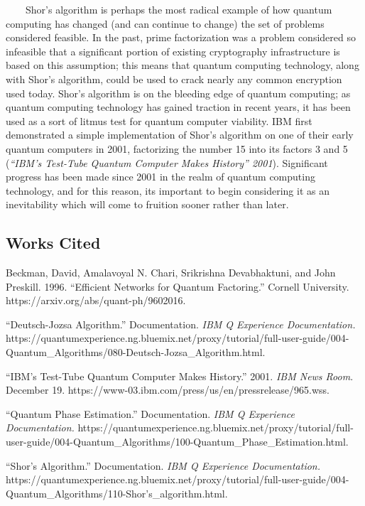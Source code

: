 \documentclass[11pt]{article}
\begin{document}
~~~~Shor's algorithm is perhaps the most radical example of how quantum
computing has changed (and can continue to change) the set of problems
considered feasible. In the past, prime factorization was a problem
considered so infeasible that a significant portion of existing
cryptography infrastructure is based on this assumption; this means that
quantum computing technology, along with Shor's algorithm, could be used
to crack nearly any common encryption used today. Shor's algorithm is on
the bleeding edge of quantum computing; as quantum computing technology
has gained traction in recent years, it has been used as a sort of
litmus test for quantum computer viability. IBM first demonstrated a
simple implementation of Shor's algorithm on one of their early quantum
computers in 2001, factorizing the number 15 into its factors 3 and 5
(\emph{``IBM's Test-Tube Quantum Computer Makes History'' 2001}).
Significant progress has been made since 2001 in the realm of quantum
computing technology, and for this reason, its important to begin
considering it as an inevitability which will come to fruition sooner
rather than later.

    \hypertarget{works-cited}{%
\subsection{Works Cited}\label{works-cited}}

Beckman, David, Amalavoyal N. Chari, Srikrishna Devabhaktuni, and John
Preskill. 1996. ``Efficient Networks for Quantum Factoring.'' Cornell
University. https://{}arxiv.org/abs/quant-ph/9602016.

``Deutsch-Jozsa Algorithm.'' Documentation. \emph{IBM Q Experience
Documentation.}
https://{}quantumexperience.ng.bluemix.net/proxy/tutorial/full-user-guide/004-Quantum\_Algorithms/080-Deutsch-Jozsa\_Algorithm.html.

``IBM's Test-Tube Quantum Computer Makes History.'' 2001. \emph{IBM News
Room}. December 19.
https://{}www-03.ibm.com/press/us/en/pressrelease/965.wss.

``Quantum Phase Estimation.'' Documentation. \emph{IBM Q Experience
Documentation.}
https://{}quantumexperience.ng.bluemix.net/proxy/tutorial/full-user-guide/004-Quantum\_Algorithms/100-Quantum\_Phase\_Estimation.html.

``Shor's Algorithm.'' Documentation. \emph{IBM Q Experience
Documentation.}
https://{}quantumexperience.ng.bluemix.net/proxy/tutorial/full-user-guide/004-Quantum\_Algorithms/110-Shor's\_algorithm.html.
\end{document}
